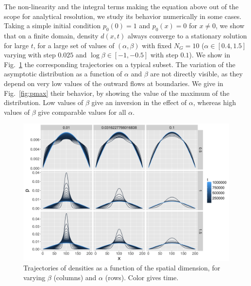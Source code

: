 The non-linearity and the integral terms making the equation above out of the scope for analytical resolution, we study its behavior numerically in some cases. Taking a simple initial condition $p_0(0)=1$ and $p_0(x)=0$ for $x\neq 0$, we show that on a finite domain, density $d(x,t)$ always converge to a stationary solution for large $t$, for a large set of values of $(\alpha,\beta)$ with fixed $N_G=10$ ($\alpha\in \left[0.4,1.5\right]$ varying with step $0.025$ and $\log\beta \in \left[-1,-0.5\right]$ with step $0.1$). We show in Fig.~\ref{fig:stationary} the corresponding trajectories on a typical subset. The variation of the asymptotic distribution as a function of $\alpha$ and $\beta$ are not directly visible, as they depend on very low values of the outward flows at boundaries. We give in Fig.~\ref{fig:pmax} their behavior, by showing the value of the maximum of the distribution. Low values of $\beta$ give an inversion in the effect of $\alpha$, whereas high values of $\beta$ give comparable values for all $\alpha$.




\begin{figure}[!h]
\centering
\includegraphics[width=\textwidth]{figuresraw/stationary}
\caption{Trajectories of densities as a function of the spatial dimension, for varying $\beta$ (columns) and $\alpha$ (rows). Color gives time.}
\label{fig:stationary}
\end{figure}



